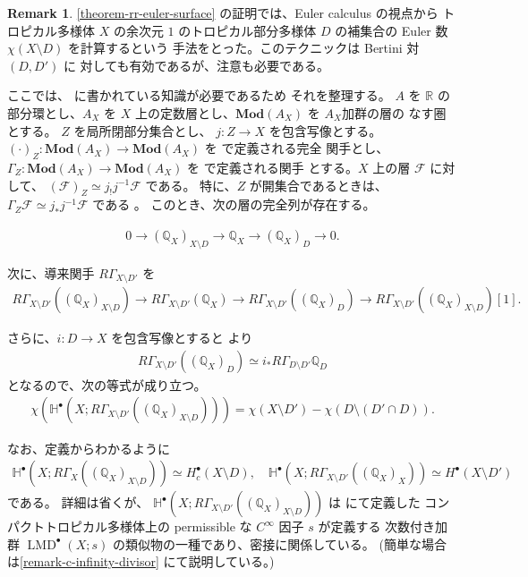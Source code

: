 \documentclass[a4paper,dvipdfmx,reqno,12pt]{amsart}
\theoremstyle{definition}
\newtheorem{remark}[theorem]{Remark}
\newcommand{\opn}[1]{\operatorname{#1}}
\newcommand{\catn}[1]{\mathbf{#1}}
\numberwithin{equation}{section}
\begin{document}
\begin{remark}

\cref{theorem-rr-euler-surface} 
の証明では、Euler calculus の視点から
トロピカル多様体 $X$ の余次元 $1$ のトロピカル部分多様体
$D$ の補集合の Euler 数 $\chi(X\setminus D)$ を計算するという
手法をとった。このテクニックは Bertini 対 $(D,D')$ に
対しても有効であるが、注意も必要である。

ここでは、\cite{MR1299726} に書かれている知識が必要であるため
それを整理する。
$A$ を $\mathbb{R}$ の部分環とし、$A_X$ を
$X$ 上の定数層とし、$\catn{Mod}(A_X)$ を $A_X$加群の層の
なす圏とする。
$Z$ を局所閉部分集合とし、
$j\colon Z\to X$ を包含写像とする。
$(\cdot)_{Z}\colon \catn{Mod}(A_X) \to \catn{Mod}(A_X)$
を \cite[Proposition 2.3.6]{MR1299726} で定義される完全
関手とし、
$\Gamma_{Z}\colon \catn{Mod}(A_X) \to \catn{Mod}(A_X)$
を \cite[Definition 2.3.8]{MR1299726} で定義される関手
とする。$X$ 上の層 $\mathcal{F}$ に対して、
$(\mathcal{F})_{Z}\simeq j_!j^{-1}\mathcal{F}$ である。
特に、$Z$ が開集合であるときは、
$\Gamma_{Z}\mathcal{F}\simeq
j_*j^{-1}\mathcal{F}$ である
\cite[Proposition 2.3.9 (iii)]{MR1299726}。
このとき、次の層の完全列が存在する。

\begin{align}
\label{equation-closed-open-exact}
0 \to (\mathbb{Q}_X)_{X\setminus D}
\to \mathbb{Q}_X \to (\mathbb{Q}_X)_{D} \to 0.
\end{align}

次に、導来関手 $R\Gamma_{X\setminus D'}$ を
\begin{align}
R\Gamma_{X\setminus D'}((\mathbb{Q}_X)_{X\setminus D})
\to  R\Gamma_{X\setminus D'}(\mathbb{Q}_X)
\to R\Gamma_{X\setminus D'}((\mathbb{Q}_X)_D)
\to R\Gamma_{X\setminus D'}((\mathbb{Q}_X)_{X\setminus D})[1].
\end{align}


さらに、$i\colon D\to X$ を包含写像とすると
\cite[(2.3.20)]{MR1299726} より
\begin{align}
R\Gamma_{X\setminus D'}((\mathbb{Q}_X)_D)
\simeq i_* R\Gamma_{D\setminus D'}\mathbb{Q}_D
\end{align}
となるので、次の等式が成り立つ。
\begin{align}
\chi(\mathbb{H}^{\bullet}(X;R\Gamma_{X\setminus D'}((\mathbb{Q}_X)_{X\setminus D})))
= \chi(X\setminus D')
- \chi(D\setminus (D'\cap D)).
\end{align}

なお、定義からわかるように
\begin{align}
\mathbb{H}^{\bullet}(X;R\Gamma_{X}
((\mathbb{Q}_X)_{X\setminus D}))
\simeq H^{\bullet}_c(X\setminus D), \quad
\mathbb{H}^{\bullet}(X;R\Gamma_{X\setminus D'}
((\mathbb{Q}_X)_{X}))
\simeq H^{\bullet}(X\setminus D')
\end{align}
である。
詳細は省くが、
$\mathbb{H}^{\bullet}(X;R\Gamma_{X\setminus D'}
((\mathbb{Q}_X)_{X\setminus D}))$
は \cite{tsutsui2023graded} にて定義した
コンパクトトロピカル多様体上の
permissible な $C^{\infty}$ 因子 $s$ が定義する
次数付き加群 $\opn{LMD}^{\bullet}(X;s)$
の類似物の一種であり、密接に関係している。
(簡単な場合は\cref{remark-c-infinity-divisor}
にて説明している。)




\end{remark}
\end{document}
